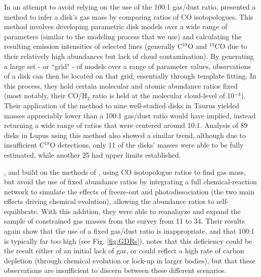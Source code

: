 In an attempt to avoid relying on the use of the 100:1 gas/dust ratio, \citet{WilliamsBest2014} presented a method to infer a disk's gas mass by comparing ratios of CO isotopologues. This method involves developing parametric disk models over a wide range of parameters (similar to the modeling process that we use) and calculating the resulting emission intensities of selected lines (generally C$^{18}$O and $^{13}$CO due to their relatively high abundances but lack of cloud contamination). By generating a large set - or ``grid" - of models over a range of parameter values, observations of a disk can then be located on that grid, essentially through template fitting. In this process, they hold certain molecular and atomic abundance ratios fixed (most notably, their CO/H$_2$ ratio is held at the molecular cloud-level of 10$^{-4}$). Their application of the method to nine well-studied disks in Taurus yielded masses appreciably lower than a 100:1 gas/dust ratio would have implied, instead returning a wide range of ratios that were centered around 10:1. Analysis of 89 disks in Lupus \citep{Ansdell2016} using this method also showed a similar trend, although due to insufficient C$^{18}$O detections, only 11 of the disks' masses were able to be fully estimated, while another 25 had upper limits established.

\citet{Miotello2014}, \citet{Miotello2016} and \citet{Miotello2017} build on the methods of \citet{WilliamsBest2014}, using CO isotopologue ratios to find gas mass, but avoid the use of fixed abundance ratios by integrating a full chemical-reaction network to simulate the effects of freeze-out and photodissociation (the two main effects driving chemical evolution), allowing the abundance ratios to self-equilibrate. With this addition, they were able to reanalayze and expand the sample of constrained gas masses from the \citet{Ansdell2016} survey from 11 to 34. Their results again show that the use of a fixed gas/dust ratio is inappropriate, and that 100:1 is typically far too high (see Fig. \ref{fig:GDRs}). \citet{Miotello2017} notes that this deficiency could be the result either of an initial lack of gas, or could reflect a high rate of carbon depletion (through chemical evolution or lock-up in larger bodies), but that these observations are insufficient to discern between these different scenarios.



